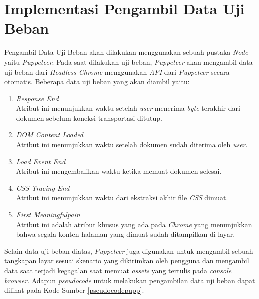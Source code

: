 	\section{Implementasi Pengambil Data Uji Beban}
		Pengambil Data Uji Beban akan dilakukan menggunakan sebuah pustaka \textit{Node} yaitu \textit{Puppeteer}. Pada saat dilakukan uji beban, \textit{Puppeteer} akan mengambil data uji beban dari \textit{Headless Chrome} menggunakan \textit{API} dari \textit{Puppeteer} secara otomatis. Beberapa data uji beban yang akan diambil yaitu:
		\begin{enumerate}
			\item \textit{Response End} \\
				Atribut ini menunjukkan waktu setelah \textit{user} menerima \textit{byte} terakhir dari dokumen sebelum koneksi transportasi ditutup.
			\item \textit{DOM Content Loaded} \\
				Atribut ini menunjukkan waktu setelah dokumen sudah diterima oleh \textit{user}.
			\item \textit{Load Event End} \\
				Atribut ini mengembalikan waktu ketika memuat dokumen selesai.
			\item \textit{CSS Tracing End} \\
				Atribut ini menunjukkan waktu dari ekstraksi akhir file \textit{CSS} dimuat.
			\item \textit{First Meaningfulpain} \\
				Atribut ini adalah atribut khusus yang ada pada \textit{Chrome} yang menunjukkan bahwa segala konten halaman yang dimuat sudah ditampilkan di layar. \\
		\end{enumerate}
	 
	 	\indent Selain data uji beban diatas, \textit{Puppeteer} juga digunakan untuk mengambil sebuah tangkapan layar sesuai skenario yang dikirimkan oleh pengguna dan mengambil data saat terjadi kegagalan saat memuat \textit{assets} yang tertulis pada \textit{console browser}. Adapun \textit{pseudocode} untuk melakukan pengambilan data uji beban dapat dilihat pada Kode Sumber \ref{pseudocodepupp}.
	 	
